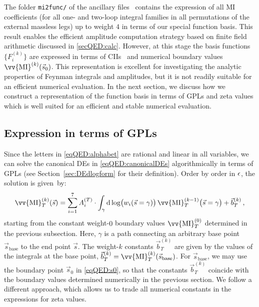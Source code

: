 \documentclass[main.tex]{subfiles}
\begin{document}
The folder \texttt{mi2func/} of the ancillary files~\cite{zenodo} contains the expression of all MI coefficients (for all one- and two-loop integral families in all permutations of the external massless legs) up to weight $4$ in terms of our special function basis. This result enables the efficient amplitude computation strategy based on finite field arithmetic discussed in \cref{secQED:calc}. However, at this stage the basis functions $\{F^{(k)}_i\}$ are expressed in terms of CIIs~\cite{Chen:1977oja} and numerical boundary values $\vv{\text{MI}}^{(k)}(\vec{s}_0)$. This representation is excellent for investigating the analytic properties of Feynman integrals and amplitudes, but it is not readily suitable for an efficient numerical evaluation.
In the next section, we discuss how we construct a representation of the function basis in terms of GPLs and zeta values which is well suited for an efficient and stable numerical evaluation.

\subsection{Expression in terms of GPLs}
\label{secQED:basis_MPLs}
Since the letters in \cref{eqQED:alphabet} are rational and linear in all variables, we can solve the canonical DEs in \cref{eqQED:canonicalDEs} algorithmically in terms of GPLs (see Section~\ref{sec:DEdlogform} for their definition). Order by order in $\epsilon$, the solution is given~by:
\begin{align} \label{eqQED:solution}
\vv{\text{MI}}_T^{(k)}(\vec{s}) = \sum_{i=1}^7 A_i^{(T)} \cdot \int_{\gamma} \dd \log \bigl(w_i(\vec{s}=\gamma) \bigr) \,\vv{\text{MI}}_T^{(k-1)}\bigl(\vec{s}=\gamma\bigr) + \vec{b}^{(k)}_{T} \,,
\end{align}
starting from the constant weight-$0$ boundary values $\vv{\text{MI}}_T^{(0)}$ determined in the previous subsection. Here, $\gamma$ is a path connecting an arbitrary base point $\vec{s}_{\mathrm{base}}$ to the end point $\vec{s}$. The weight-$k$ constants $\vec{b}^{(k)}_{T} $ are given by the values of the integrals at the base point, $ \vec{b}^{(k)}_{T} = \vv{\text{MI}}_T^{(k)}(\vec{s}_{\mathrm{base}})$.
For $\vec{s}_{\mathrm{base}}$, we may use the boundary point $\vec{s}_0$ in \cref{eqQED:s0}, so that the constants $\vec{b}^{(k)}_{T}$ coincide with the boundary values determined numerically in the previous section. We follow a different approach, which allows us to trade all numerical constants in the expressions for zeta values.
\end{document}
